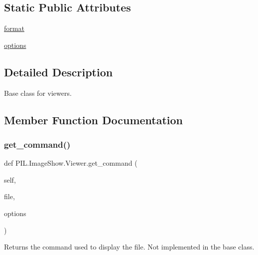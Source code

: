 \subsection*{Static Public Attributes}
\begin{DoxyCompactItemize}
\item 
\hyperlink{classPIL_1_1ImageShow_1_1Viewer_ab158c90c08ee5e9381ead4d82c3d4636}{format}
\item 
\hyperlink{classPIL_1_1ImageShow_1_1Viewer_acb3726be586129f8100b5f57cd61bf97}{options}
\end{DoxyCompactItemize}


\subsection{Detailed Description}
\begin{DoxyVerb}Base class for viewers.\end{DoxyVerb}
 

\subsection{Member Function Documentation}
\mbox{\label{classPIL_1_1ImageShow_1_1Viewer_aac88a368669e21d3e8b0ce2993407752}} 
\subsubsection{\texorpdfstring{get\+\_\+command()}{get\_command()}}
{\footnotesize\ttfamily def P\+I\+L.\+Image\+Show.\+Viewer.\+get\+\_\+command (\begin{DoxyParamCaption}\item[{}]{self,  }\item[{}]{file,  }\item[{}]{options }\end{DoxyParamCaption})}

\begin{DoxyVerb}Returns the command used to display the file.
Not implemented in the base class.
\end{DoxyVerb}
 \mbox{\label{classPIL_1_1ImageShow_1_1Viewer_a0585450f79b17f3f8cffec7d4d03f2aa}} 
